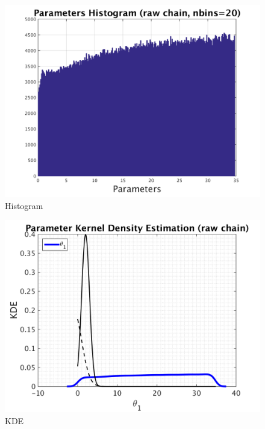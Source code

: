 \begin{figure}[h!]
  
  \centering
   \includegraphics[scale=0.75]{output_1000000/simple_ip_hist_raw}
   \caption{Histogram}
\end{figure}



\begin{figure}[h!]
  
  \centering
   \includegraphics[scale=0.75]{output_1000000/simple_ip_kde_raw}
   \caption{ KDE }
\end{figure}

